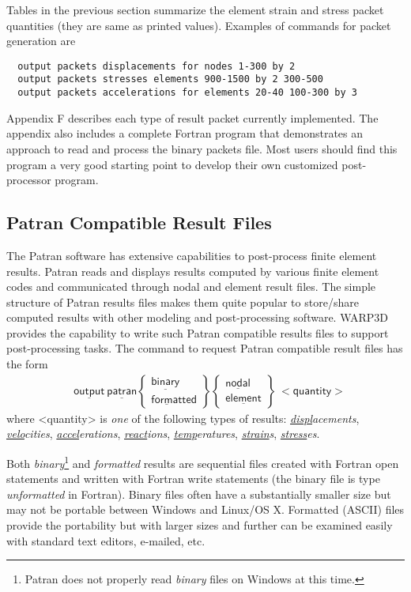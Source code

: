 \documentclass[11pt]{report}
\numberwithin{equation}{section}
\newcommand{\nin} {\noindent}
\newcommand{\ul} {\underline}
\newcommand{\hv} {\mathsf}   %
\newcommand{\ti}{\emph}
\newcommand{\tl}{\textless\xspace}
\newcommand{\tg}{\textgreater\xspace}
\begin{document}
\nin Tables in the previous section summarize the element strain and stress
packet quantities (they are same as printed values). Examples of commands for packet
generation are
\small
\begin{verbatim}
  output packets displacements for nodes 1-300 by 2
  output packets stresses elements 900-1500 by 2 300-500
  output packets accelerations for elements 20-40 100-300 by 3
\end{verbatim}
\normalsize
\nin
Appendix F describes each type of result packet currently implemented. The
appendix also includes a complete Fortran program that demonstrates an approach to
read and process the binary packets file. Most users should find this program a
very good starting point to develop their own customized post-processor program.

\subsection{Patran Compatible Result Files}
\nin
The Patran software has extensive capabilities to post-process
finite element results. Patran reads and displays results computed
by various finite element codes and communicated  through nodal and element
result files. The simple structure of Patran results files makes
them quite popular to store/share computed results with other
modeling and post-processing software. WARP3D provides the
capability to write such Patran compatible results files to support
post-processing tasks. The command to request 
Patran compatible result files has the form
\begin{align*}
& \hv{\ul{output}\ \ul{patran}   }
\begin{Bmatrix}
\hv{\ul{binary}} \\ \hv{\ul{format}ted} 
\end{Bmatrix} 
\begin{Bmatrix}
\hv{\ul{nodal}} \\ \hv{\ul{element}} 
\end{Bmatrix} \ \hv{<quantity>}
\end{align*}
\nin
where \tl{quantity}\tg is \ti{one} of the following types of results: 
\ti{\ul{displ}acements},
\ti{\ul{velo}cities}, 
\ti{\ul{accel}erations}, \ti{\ul{react}ions}, \ti{\ul{temp}eratures}, \ti{\ul{strain}s}, 
\ti{\ul{stress}es}. 

Both \ti{binary}\footnote[1]{Patran does
not properly read \ti{binary} files on Windows at this time.} and \ti{formatted} results are
sequential files created with Fortran open statements and written with
Fortran write statements (the binary file is type \ti{unformatted} in Fortran).  Binary
files often have a substantially smaller size but may not be portable between
Windows and Linux/OS X. Formatted (ASCII) files provide the portability but with
larger sizes and further can be examined easily with standard text editors, e-mailed, etc.
\end{document}
